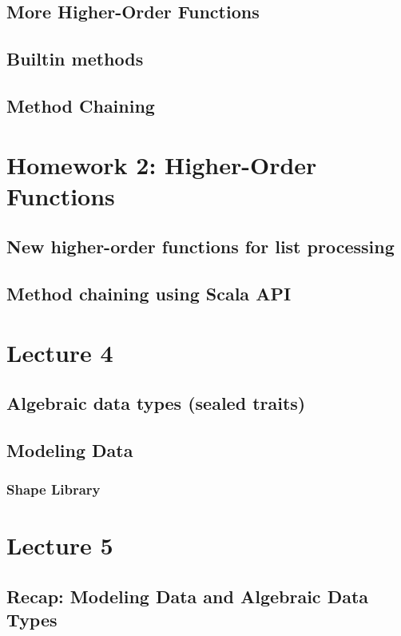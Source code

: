 \documentclass{book}
\begin{document}
\section{More Higher-Order Functions}

\section{Builtin methods}

\section{Method Chaining}

\chapter{Homework 2: Higher-Order Functions}

\section{New higher-order functions for list processing}
\section{Method chaining using Scala API}

\chapter{Lecture 4}

\section{Algebraic data types (sealed traits)}

\section{Modeling Data}

\subsection{Shape Library}

\chapter{Lecture 5}

\section{Recap: Modeling Data and Algebraic Data Types}
\end{document}
